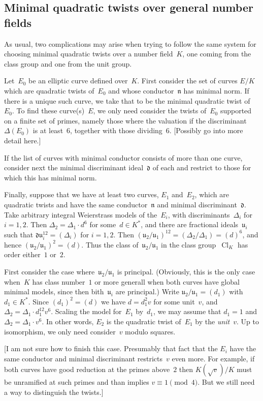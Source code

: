 \documentclass{article}
\theoremstyle{remark}
\def\d{{\mathfrak d}}
\def\n{{\mathfrak n}}
\def\u{{\mathfrak u}}
\DeclareMathOperator{\Cl}{Cl}
\begin{document}
\subsection{Minimal quadratic twists over general number fields}
As usual, two complications may arise when trying to follow the same
system for choosing minimal quadratic twists over a number field~$K$,
one coming from the class group and one from the unit group.

Let~$E_0$ be an elliptic curve defined over~$K$.  First consider the
set of curves $E/K$ which are quadratic twists of~$E_0$ and whose
conductor~$\n$ has minimal norm.  If there is a unique such curve, we
take that to be the minimal quadratic twist of~$E_0$.  To find these
curve(s)~$E$, we only need consider the twists of~$E_0$ supported on a
finite set of primes, namely those where the valuation if the
discriminant~$\Delta(E_0)$ is at least~$6$, together with those
dividing~$6$. [Possibly go into more detail here.]

If the list of curves with minimal conductor consists of more than one
curve, consider next the minimal discriminant ideal~$\d$ of each and
restrict to those for which this has minimal norm.

Finally, suppose that we have at least two curves, $E_1$ and~$E_2$,
which are quadratic twists and have the same conductor~$\n$ and
minimal discriminant~$\d$.  Take arbitrary integral Weierstrass models
of the~$E_i$, with discriminants~$\Delta_i$ for~$i=1,2$.  Then
$\Delta_2=\Delta_1\cdot d^6$ for some~$d\in K^*$, and there are
fractional ideals~$\u_i$ such that $\d\u_i^{12}=(\Delta_i)$ for
$i=1,2$.  Then $(\u_2/\u_1)^{12}=(\Delta_2/\Delta_1)=(d)^6$, and hence
$(\u_2/\u_1)^{2}=(d)$.  Thus the class of~$\u_2/\u_1$ in the class
group~$\Cl_K$ has order either~$1$ or~$2$.

First consider the case where~$\u_2/\u_1$ is principal.  (Obviously,
this is the only case when~$K$ has class number~$1$ or more generall
when both curves have global minimal models, since then bith~$\u_i$
are principal.)  Write $\u_2/\u_1=(d_1)$ with~$d_1\in K^*$.  Since
$(d_1)^2=(d)$ we have $d=d_1^2v$ for some unit~$v$, and
$\Delta_2=\Delta_1\cdot d_1^{12}v^6$.  Scaling the model for~$E_1$
by~$d_1$, we may assume that $d_1=1$ and $\Delta_2=\Delta_1\cdot v^6$.
In other words, $E_2$ is the quadratic twist of~$E_1$ by the {\em
  unit}~$v$.  Up to isomorphism, we only need consider~$v$ modulo
squares.

[I am not sure how to finish this case.  Presumably that fact that the
  $E_i$ have the same conductor and minimal discriminant restricts~$v$
  even more.  For example, if both curves have good reduction at the
  primes above~$2$ then $K(\sqrt{v})/K$ must be unramified at such
  primes and than implies $v\equiv1\pmod4$.  But we still need a way
  to distinguish the twists.]
\end{document}
